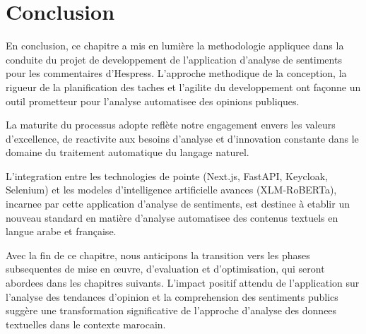 \section{Conclusion}

En conclusion, ce chapitre a mis en lumière la methodologie appliquee dans la conduite du projet de developpement de l'application d'analyse de sentiments pour les commentaires d'Hespress. L'approche methodique de la conception, la rigueur de la planification des taches et l'agilite du developpement ont façonne un outil prometteur pour l'analyse automatisee des opinions publiques.

La maturite du processus adopte reflète notre engagement envers les valeurs d'excellence, de reactivite aux besoins d'analyse et d'innovation constante dans le domaine du traitement automatique du langage naturel.

L'integration entre les technologies de pointe (Next.js, FastAPI, Keycloak, Selenium) et les modeles d'intelligence artificielle avances (XLM-RoBERTa), incarnee par cette application d'analyse de sentiments, est destinee à etablir un nouveau standard en matière d'analyse automatisee des contenus textuels en langue arabe et française.

Avec la fin de ce chapitre, nous anticipons la transition vers les phases subsequentes de mise en œuvre, d'evaluation et d'optimisation, qui seront abordees dans les chapitres suivants. L'impact positif attendu de l'application sur l'analyse des tendances d'opinion et la comprehension des sentiments publics suggère une transformation significative de l'approche d'analyse des donnees textuelles dans le contexte marocain.
